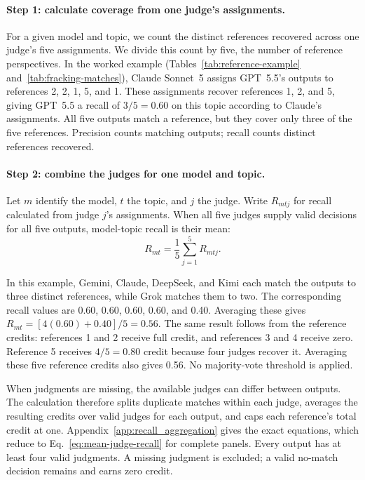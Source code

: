 \documentclass[11pt,a4paper]{article}
\begin{document}
\paragraph{Step 1: calculate coverage from one judge's assignments.}
For a given model and topic, we count the distinct references recovered
across one judge's five assignments. We divide this count by five,
the number of reference perspectives. In the worked example
(Tables~\ref{tab:reference-example} and~\ref{tab:fracking-matches}),
Claude Sonnet~5 assigns GPT~5.5's outputs to references
2, 2, 1, 5, and 1. These assignments recover references 1, 2, and 5,
giving GPT~5.5 a recall of $3/5=0.60$ on this topic according to
Claude's assignments. All five outputs match a reference, but they
cover only three of the five references. Precision counts matching
outputs; recall counts distinct references recovered.

\paragraph{Step 2: combine the judges for one model and topic.}
Let $m$ identify the model, $t$ the topic, and $j$ the judge. Write $R_{mtj}$ for recall calculated from judge $j$'s assignments. When all five judges supply valid decisions for all five outputs, model-topic recall is their mean:
\begin{equation}
R_{mt}=\frac{1}{5}\sum_{j=1}^{5}R_{mtj}.
\label{eq:mean-judge-recall}
\end{equation}

In this example, Gemini, Claude, DeepSeek, and Kimi each match the
outputs to three distinct references, while Grok matches them to two.
The corresponding recall values are 0.60, 0.60, 0.60, 0.60, and 0.40.
Averaging these gives $R_{mt}=[4(0.60)+0.40]/5=0.56$.
The same result follows from the reference credits: references 1 and 2
receive full credit, and references 3 and 4 receive zero. Reference 5
receives $4/5=0.80$ credit because four judges recover it.
Averaging these five reference credits also gives 0.56.
No majority-vote threshold is applied.

When judgments are missing, the available judges can differ between outputs. The calculation therefore splits duplicate matches within each judge, averages the resulting credits over valid judges for each output, and caps each reference's total credit at one. Appendix~\ref{app:recall_aggregation} gives the exact equations, which reduce to Eq.~\ref{eq:mean-judge-recall} for complete panels. Every output has at least four valid judgments. A missing judgment is excluded; a valid no-match decision remains and earns zero credit.
\end{document}
